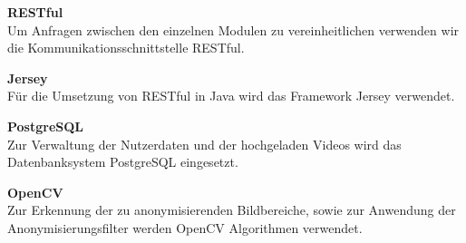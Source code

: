 \begin{description}
\item \textbf{RESTful} \hfill \\
Um Anfragen zwischen den einzelnen Modulen zu vereinheitlichen verwenden wir die Kommunikationsschnittstelle RESTful.

\item \textbf{Jersey} \hfill \\
Für die Umsetzung von RESTful in Java wird das Framework Jersey verwendet.

\item \textbf{PostgreSQL} \hfill \\
Zur Verwaltung der Nutzerdaten und der hochgeladen Videos wird das Datenbanksystem PostgreSQL eingesetzt.

\item \textbf{OpenCV} \hfill \\
Zur Erkennung der zu anonymisierenden Bildbereiche, sowie zur Anwendung der Anonymisierungsfilter werden OpenCV Algorithmen verwendet.

\end{description}